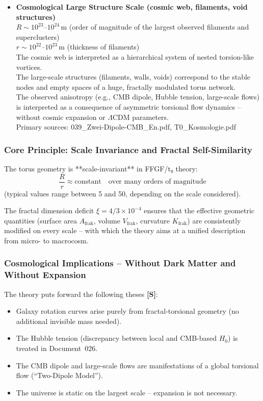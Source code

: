 \begin{itemize}
	\item \textbf{Cosmological Large Structure Scale (cosmic web, filaments, void structures)} \\
	$R \sim 10^{23}$–$10^{24}\,\text{m}$ (order of magnitude of the largest observed filaments and superclusters) \\
	$r \sim 10^{22}$–$10^{23}\,\text{m}$ (thickness of filaments) \\
	The cosmic web is interpreted as a hierarchical system of nested torsion-like vortices. \\
	The large-scale structures (filaments, walls, voids) correspond to the stable nodes and empty spaces of a huge, fractally modulated torus network. \\
	The observed anisotropy (e.g., CMB dipole, Hubble tension, large-scale flows) is interpreted as a consequence of asymmetric torsional flow dynamics – without cosmic expansion or $\Lambda$CDM parameters. \\
	Primary sources: 039\_Zwei-Dipole-CMB\_En.pdf, T0\_Kosmologie.pdf
\end{itemize}

\subsubsection{Core Principle: Scale Invariance and Fractal Self-Similarity}

The torus geometry is **scale-invariant** in FFGF/t₀ theory:
\[
\frac{R}{r} \approx \text{constant} \quad \text{over many orders of magnitude}
\]
(typical values range between 5 and 50, depending on the scale considered).

The fractal dimension deficit $\xi = 4/3 \times 10^{-4}$ ensures that the effective geometric quantities (surface area $A_{\text{frak}}$, volume $V_{\text{frak}}$, curvature $K_{\text{frak}}$) are consistently modified on every scale – with which the theory aims at a unified description from micro- to macrocosm.

\subsubsection{Cosmological Implications – Without Dark Matter and Without Expansion}

The theory puts forward the following theses \textbf{[S]}:
\begin{itemize}
	\item Galaxy rotation curves arise purely from fractal-torsional geometry (no additional invisible mass needed).
	\item The Hubble tension (discrepancy between local and CMB-based $H_0$) is treated in Document~026.
	\item The CMB dipole and large-scale flows are manifestations of a global torsional flow (``Two-Dipole Model'').
	\item The universe is static on the largest scale – expansion is not necessary.
\end{itemize}


